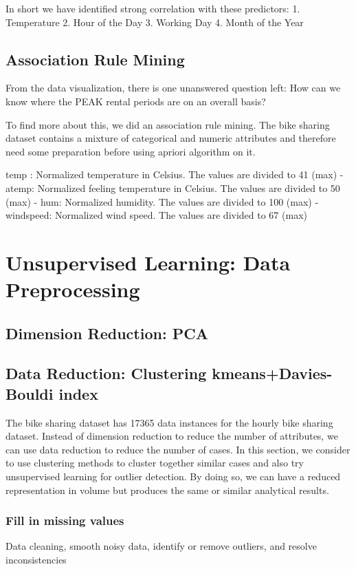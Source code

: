 \documentclass[12pt]{article}
\begin{document}
In short we have identified strong correlation with these predictors: 1. Temperature 2. Hour of the Day 3. Working Day 4. Month of the Year

\subsection{Association Rule Mining}
From the data visualization, there is one unanswered question left: How can we know where the PEAK rental periods are on an overall basis?

To find more about this, we did an association rule mining. The bike sharing dataset contains a mixture of categorical and numeric attributes and therefore need some preparation before using apriori algorithm on it.

temp : Normalized temperature in Celsius. The values are divided to 41 (max)
- atemp: Normalized feeling temperature in Celsius. The values are divided to 50 (max)
- hum: Normalized humidity. The values are divided to 100 (max)
- windspeed: Normalized wind speed. The values are divided to 67 (max)

\section{Unsupervised Learning: Data Preprocessing}
\subsection{Dimension Reduction: PCA }
\label{sec:dimension-reduction}

\subsection{Data Reduction: Clustering kmeans+Davies-Bouldi index}
\label{data-reduction}

The bike sharing dataset has  17365 data instances for the hourly bike sharing dataset. Instead of dimension reduction to reduce the number of attributes, we can use data reduction to reduce the number of cases. In this section, we consider to use clustering methods to cluster together similar cases and also try unsupervised learning for outlier detection. By doing so, we can have a reduced representation in volume but produces the same or similar analytical results.
\subsubsection{Fill in missing values}
Data cleaning, smooth noisy data, identify or remove outliers, and resolve inconsistencies
\end{document}
